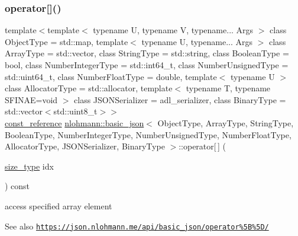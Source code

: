 \subsubsection{\texorpdfstring{operator[]()}{operator[]()}\hspace{0.1cm}{\footnotesize\ttfamily [2/8]}}
{\footnotesize\ttfamily template$<$template$<$ typename U, typename V, typename... Args $>$ class Object\+Type = std\+::map, template$<$ typename U, typename... Args $>$ class Array\+Type = std\+::vector, class String\+Type  = std\+::string, class Boolean\+Type  = bool, class Number\+Integer\+Type  = std\+::int64\+\_\+t, class Number\+Unsigned\+Type  = std\+::uint64\+\_\+t, class Number\+Float\+Type  = double, template$<$ typename U $>$ class Allocator\+Type = std\+::allocator, template$<$ typename T, typename S\+F\+I\+N\+A\+E=void $>$ class J\+S\+O\+N\+Serializer = adl\+\_\+serializer, class Binary\+Type  = std\+::vector$<$std\+::uint8\+\_\+t$>$$>$ \\
\hyperlink{classnlohmann_1_1basic__json_ab8a1c33ee7b154fc41ca2545aa9724e6}{const\+\_\+reference} \hyperlink{classnlohmann_1_1basic__json}{nlohmann\+::basic\+\_\+json}$<$ Object\+Type, Array\+Type, String\+Type, Boolean\+Type, Number\+Integer\+Type, Number\+Unsigned\+Type, Number\+Float\+Type, Allocator\+Type, J\+S\+O\+N\+Serializer, Binary\+Type $>$\+::operator\mbox{[}$\,$\mbox{]} (\begin{DoxyParamCaption}\item[{\hyperlink{classnlohmann_1_1basic__json_a3ada29bca70b4965f6fd37ec1c8f85f7}{size\+\_\+type}}]{idx }\end{DoxyParamCaption}) const\hspace{0.3cm}{\ttfamily [inline]}}



access specified array element 

\begin{DoxySeeAlso}{See also}
\href{https://json.nlohmann.me/api/basic_json/operator%5B%5D/}{\tt https\+://json.\+nlohmann.\+me/api/basic\+\_\+json/operator\%5\+B\%5\+D/} 
\end{DoxySeeAlso}
\mbox{\label{classnlohmann_1_1basic__json_a3f45f3820c456ad2e3f3df2926564151}} 
